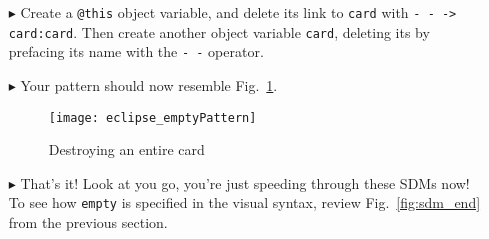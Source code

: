 \begin{itemize}
\item[$\blacktriangleright$] Create a \texttt{@this} object variable, and delete its link to \texttt{card} with \texttt{-~- -> card:card}. Then create another
object variable \texttt{card}, deleting its by prefacing its name with the \texttt{-~-} operator.

\vspace{0.5cm}

\item[$\blacktriangleright$] Your pattern should now resemble Fig.~\ref{fig:emptyPattern}.

\vspace{0.5cm}

\begin{figure}[htpb]
\begin{center}
  \texttt{[image: eclipse\_emptyPattern]}
  \caption{Destroying an entire card}
  \label{fig:emptyPattern}
\end{center}
\end{figure}

\item[$\blacktriangleright$] That's it! Look at you go, you're just speeding through these SDMs now! To see how \texttt{empty} is specified in the visual
syntax, review Fig.~\ref{fig:sdm_end} from the previous section.

\end{itemize}
